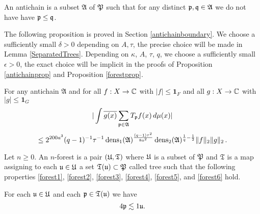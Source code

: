 An antichain is a subset $\mathfrak{A}$
of $\mathfrak P$ such that for any distinct $\mathfrak p,\mathfrak q\in \mathfrak{A}$ we do not have have $\mathfrak p\le \mathfrak q$.

The following proposition is proved in Section \ref{antichainboundary}.
We choose a sufficiently small $\delta > 0$ depending on $A, \tau$, the precise choice will be made in Lemma \ref{SeparatedTrees}.
Depending on $\kappa$, $A$, $\tau$, $q$, we choose a sufficiently small $\epsilon > 0$, the exact choice will be implicit in the proofs of Proposition \ref{antichainprop}  and Proposition \ref{forestprop}. 


\begin{prop}\label{antichainprop}
For any antichain $\mathfrak{A} $ and  for all $f:X\to \mathbb{C}$ with $|f|\le \mathbf{1}_F$ and all
$g:X\to \mathbb{C}$ with $|g|\le \mathbf{1}_{G}$
\begin{equation} \label{eq antiprop}
  |\int \overline{g(x)} \sum_{\mathfrak p \in \mathfrak{A}} T_{\mathfrak p} f(x)\, d\mu(x)|
  \end{equation}
  \begin{equation}
      \le  2^{200a^3}({q}-1)^{-1} \tau^{-1}\operatorname{\operatorname{dens}}_1(\mathfrak{A})^{\frac {(q-1)\tau^2}{8a^2}}\operatorname{\operatorname{dens}}_2(\mathfrak{A})^{\frac 1{q}-\frac 12}  \|f\|_2\|g\|_2\, .
  \end{equation}
\end{prop}

Let $n\ge 0$.
An $n$-forest is a pair $(\mathfrak U, \mathfrak{T})$
where  $\mathfrak U$ is a subset of $\mathfrak P$
and $\mathfrak{T}$ is a map assigning to
each $\mathfrak u\in \mathfrak U$ a set $\mathfrak T (\mathfrak u)\subset \mathfrak P$ called tree
such that the following properties
\eqref{forest1}, \eqref{forest2},
\eqref{forest3},
\eqref{forest4},
\eqref{forest5}, and
\eqref{forest6}
hold.

For each $\mathfrak u\in \mathfrak U$ and each $\mathfrak p\in \mathfrak T(\mathfrak u)$
we have
\begin{equation}\label{forest1}
4\mathfrak p\lesssim 1\mathfrak u.
\end{equation}

